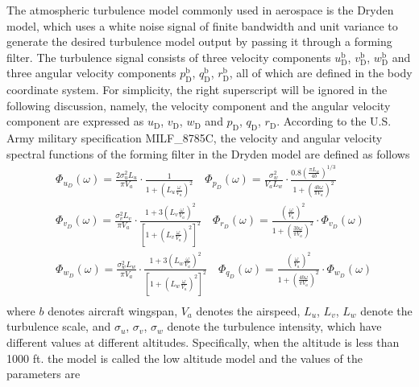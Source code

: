 The atmospheric turbulence model commonly used in aerospace is the Dryden model\cite{military1980u}, which uses a white noise signal of finite bandwidth and unit variance to generate the desired turbulence model output by passing it through a forming filter. The turbulence signal consists of three velocity components $u_{\mathrm{D}}^{\mathrm{b}}$, $v_{\mathrm{D}}^{\mathrm{b}}$, $w_{\mathrm{D}}^{\mathrm{b}}$ and three angular velocity components $p_{\mathrm{D}}^{\mathrm{b}}$, $q_{\mathrm{D}}^{\mathrm{b}}$, $r_{\mathrm{D}}^{\mathrm{b}}$, all of which are defined in the body coordinate system. For simplicity, the right superscript will be ignored in the following discussion, namely, the velocity component and the angular velocity component are expressed as $u_{\mathrm{D}}$, $v_{\mathrm{D}}$, $w_{\mathrm{D}}$ and $p_{\mathrm{D}}$, $q_{\mathrm{D}}$, $r_{\mathrm{D}}$. According to the U.S. Army military specification MILF\_8785C\cite{military1980u}\cite{chalk1969background}, the velocity and angular velocity spectral functions of the forming filter in the Dryden model are defined as follows\\
\begin{equation}\label{eq1}
\begin{aligned}
& \Phi_{u_D}(\omega)=\frac{2 \sigma_u^2 L_u}{\pi V_a} \cdot \frac{1}{1+\left(L_u \frac{\omega}{V_a}\right)^2} \quad \Phi_{p_D}(\omega)=\frac{\sigma_w^2}{V_a L_w} \cdot \frac{0.8\left(\frac{\pi L_w}{4 b}\right)^{1 / 3}}{1+\left(\frac{4 b \omega}{\pi V_a}\right)^2}\\ 
& \Phi_{v_D}(\omega)=\frac{\sigma_v^2 L_v}{\pi V_a} \cdot \frac{1+3\left(L_v \frac{\omega}{V_a}\right)^2}{\left[1+\left(L_v \frac{\omega}{V_a}\right)^2\right]^2} \quad \Phi_{r_D}(\omega)=\frac{\left(\frac{\omega}{V_a}\right)^2}{1+\left(\frac{3 b \omega}{\pi V_a}\right)^2} \cdot \Phi_{v_D}(\omega) \\
& \Phi_{w_D}(\omega)=\frac{\sigma_w^2 L_w}{\pi V_a} \cdot \frac{1+3\left(L_w \frac{\omega}{V_a}\right)^2}{\left[1+\left(L_w \frac{\omega}{V_a}\right)^2\right]^2} \quad \Phi_{q_D}(\omega)=\frac{\left(\frac{\omega}{V_a}\right)^2}{1+\left(\frac{4 b \omega}{\pi V_a}\right)^2} \cdot \Phi_{w_D}(\omega) \\
\end{aligned}
\end{equation}
where $b$ denotes aircraft wingspan, $V_a$ denotes the airspeed, $L_u$, $L_v$, $L_w$ denote the turbulence scale, and $\sigma_u$, $\sigma_v$, $\sigma_w$ denote the turbulence intensity, which have different values at different altitudes. Specifically, when the altitude is less than 1000 ft. the model is called the low altitude model and the values of the parameters are
